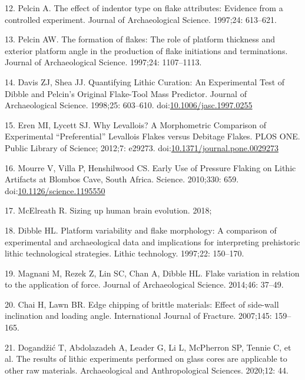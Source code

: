 \documentclass[10pt,letterpaper]{article}
\newenvironment{cslreferences}%
  {}%
  {\par}
\begin{document}
\begin{cslreferences}
\leavevmode\hypertarget{ref-pelcin_effect_1997-1}{}%
12. Pelcin A. The effect of indentor type on flake attributes: Evidence
from a controlled experiment. Journal of Archaeological Science.
1997;24: 613--621.

\leavevmode\hypertarget{ref-pelcin_formation_1997}{}%
13. Pelcin AW. The formation of flakes: The role of platform thickness
and exterior platform angle in the production of flake initiations and
terminations. Journal of Archaeological Science. 1997;24: 1107--1113.

\leavevmode\hypertarget{ref-davis_quantifying_1998}{}%
14. Davis ZJ, Shea JJ. Quantifying Lithic Curation: An Experimental Test
of Dibble and Pelcin's Original Flake-Tool Mass Predictor. Journal of
Archaeological Science. 1998;25: 603--610.
doi:\href{https://doi.org/10.1006/jasc.1997.0255}{10.1006/jasc.1997.0255}

\leavevmode\hypertarget{ref-eren_why_2012}{}%
15. Eren MI, Lycett SJ. Why Levallois? A Morphometric Comparison of
Experimental ``Preferential'' Levallois Flakes versus Debitage Flakes.
PLOS ONE. Public Library of Science; 2012;7: e29273.
doi:\href{https://doi.org/10.1371/journal.pone.0029273}{10.1371/journal.pone.0029273}

\leavevmode\hypertarget{ref-mourre_early_2010}{}%
16. Mourre V, Villa P, Henshilwood CS. Early Use of Pressure Flaking on
Lithic Artifacts at Blombos Cave, South Africa. Science. 2010;330: 659.
doi:\href{https://doi.org/10.1126/science.1195550}{10.1126/science.1195550}

\leavevmode\hypertarget{ref-mcelreath_sizing_2018}{}%
17. McElreath R. Sizing up human brain evolution. 2018;

\leavevmode\hypertarget{ref-dibble_platform_1997}{}%
18. Dibble HL. Platform variability and flake morphology: A comparison
of experimental and archaeological data and implications for
interpreting prehistoric lithic technological strategies. Lithic
technology. 1997;22: 150--170.

\leavevmode\hypertarget{ref-magnani_flake_2014-1}{}%
19. Magnani M, Rezek Z, Lin SC, Chan A, Dibble HL. Flake variation in
relation to the application of force. Journal of Archaeological Science.
2014;46: 37--49.

\leavevmode\hypertarget{ref-chai_edge_2007}{}%
20. Chai H, Lawn BR. Edge chipping of brittle materials: Effect of
side-wall inclination and loading angle. International Journal of
Fracture. 2007;145: 159--165.

\leavevmode\hypertarget{ref-dogandzic_results_2020}{}%
21. Dogandžić T, Abdolazadeh A, Leader G, Li L, McPherron SP, Tennie C,
et al. The results of lithic experiments performed on glass cores are
applicable to other raw materials. Archaeological and Anthropological
Sciences. 2020;12: 44.


\end{cslreferences}
\end{document}
